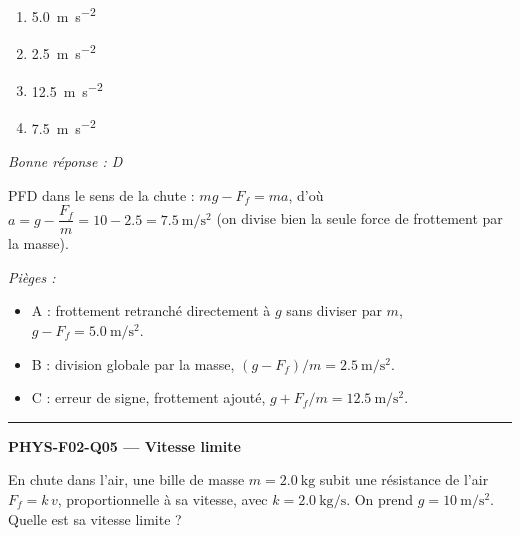 \documentclass[11pt,a4paper]{article}
\newcommand{\vv}[1]{\vec{#1}}\newcommand{\ds}{\displaystyle}
\begin{document}
\begin{center}
\end{center}
\begin{enumerate}[label=\Alph*)]
\item \qty{5.0}{\metre\per\second\squared}
\item \qty{2.5}{\metre\per\second\squared}
\item \qty{12.5}{\metre\per\second\squared}
\item \qty{7.5}{\metre\per\second\squared}
\end{enumerate}
\textit{Bonne réponse : D}\par
PFD dans le sens de la chute : $mg-F_f=ma$, d'où $a=g-\dfrac{F_f}{m}=10-\num{2.5}=\qty{7.5}{\metre\per\second\squared}$ (on divise bien la seule force de frottement par la masse).\par
\textit{Pièges :}
\begin{itemize}
\item A : frottement retranché directement à $g$ sans diviser par $m$, $g-F_f=\qty{5.0}{\metre\per\second\squared}$.
\item B : division globale par la masse, $(g-F_f)/m=\qty{2.5}{\metre\per\second\squared}$.
\item C : erreur de signe, frottement ajouté, $g+F_f/m=\qty{12.5}{\metre\per\second\squared}$.
\end{itemize}
\vspace{8pt}\hrule\vspace{8pt}
\noindent\textbf{PHYS-F02-Q05 --- Vitesse limite}\par
En chute dans l'air, une bille de masse $m=\qty{2.0}{\kilogram}$ subit une résistance de l'air $F_f=k\,v$, proportionnelle à sa vitesse, avec $k=\qty{2.0}{\kilogram\per\second}$. On prend $g=\qty{10}{\metre\per\second\squared}$. Quelle est sa vitesse limite ?
\begin{center}
\end{center}
\end{document}
